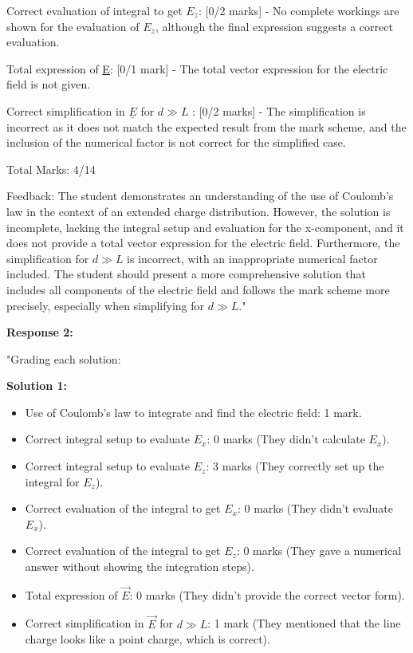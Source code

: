 \documentclass[a4paper,11pt]{article}
\begin{document}
Correct evaluation of integral to get \( E_z \): [0/2 marks] - No complete workings are shown for the evaluation of \( E_z \), although the final expression suggests a correct evaluation.

Total expression of \underline{E}: [0/1 mark] - The total vector expression for the electric field is not given.

Correct simplification in \(\underline{E}\) for \(d \gg L\) : [0/2 marks] - The simplification is incorrect as it does not match the expected result from the mark scheme, and the inclusion of the numerical factor is not correct for the simplified case.

Total Marks: 4/14

Feedback:
The student demonstrates an understanding of the use of Coulomb's law in the context of an extended charge distribution. However, the solution is incomplete, lacking the integral setup and evaluation for the x-component, and it does not provide a total vector expression for the electric field. Furthermore, the simplification for \(d \gg L\)  is incorrect, with an inappropriate numerical factor included. The student should present a more comprehensive solution that includes all components of the electric field and follows the mark scheme more precisely, especially when simplifying for \(d \gg L\)."

\textbf{Response 2:}

"Grading each solution:

\textbf{Solution 1:}

\begin{itemize}
  \item Use of Coulomb's law to integrate and find the electric field: 1 mark.
  \item Correct integral setup to evaluate \( E_x \): 0 marks (They didn't calculate \( E_x \)).
  \item Correct integral setup to evaluate \( E_z \): 3 marks (They correctly set up the integral for \( E_z \)).
  \item Correct evaluation of the integral to get \( E_x \): 0 marks (They didn't evaluate \( E_x \)).
  \item Correct evaluation of the integral to get \( E_z \): 0 marks (They gave a numerical answer without showing the integration steps).
  \item Total expression of \( \vec{E} \): 0 marks (They didn't provide the correct vector form).
  \item Correct simplification in \( \vec{E} \) for \( d \gg L \): 1 mark (They mentioned that the line charge looks like a point charge, which is correct).
\end{itemize}
\end{document}
